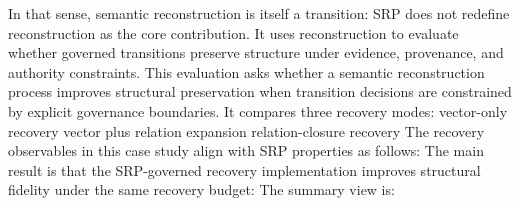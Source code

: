 {}In that sense, semantic reconstruction is itself a transition:\markdownRendererInterblockSeparator
{}\markdownRendererInterblockSeparator
{}SRP does not redefine reconstruction as the core contribution. It uses reconstruction to evaluate whether governed transitions preserve structure under evidence, provenance, and authority constraints.\markdownRendererInterblockSeparator
{}
\markdownRendererSectionEnd \markdownRendererSectionBegin
{}\markdownRendererInterblockSeparator
{}This evaluation asks whether a semantic reconstruction process improves structural preservation when transition decisions are constrained by explicit governance boundaries.\markdownRendererParagraphSeparator
{}It compares three recovery modes:\markdownRendererInterblockSeparator
{}\markdownRendererUlBeginTight
\markdownRendererUlItem vector-only recovery\markdownRendererUlItemEnd 
\markdownRendererUlItem vector plus relation expansion\markdownRendererUlItemEnd 
\markdownRendererUlItem relation-closure recovery\markdownRendererUlItemEnd 
\markdownRendererUlEndTight \markdownRendererInterblockSeparator
{}The recovery observables in this case study align with SRP properties as follows:\markdownRendererInterblockSeparator
{}\markdownRendererInterblockSeparator
{}
\markdownRendererSectionEnd \markdownRendererSectionBegin
{}\markdownRendererInterblockSeparator
{}The main result is that the SRP-governed recovery implementation improves structural fidelity under the same recovery budget:\markdownRendererInterblockSeparator
{}\markdownRendererInterblockSeparator
{}The summary view is:\markdownRendererInterblockSeparator
{}\markdownRendererInterblockSeparator
